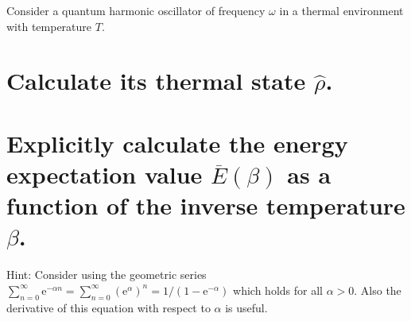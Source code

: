 \documentclass[boxes,pages]{homework}
\makeatletter
\newcommand{\e}{\mathrm{e}}
\numberwithin{@problem}{section}
\makeatother
\begin{document}
\begin{problem}
Consider a quantum harmonic oscillator of frequency $\omega$ in a thermal environment with temperature $T$.
\begin{parts}
	\part{Calculate its thermal state $\hat{\rho}$.}\label{part:3a}
	\part{Explicitly calculate the energy expectation value $\overline{E}(\beta)$ as a function of the inverse temperature $\beta$.}\label{part:3b}
\end{parts}
Hint: Consider using the geometric series $\sum_{n=0}^\infty\e^{-\alpha n} = \sum_{n=0}^\infty(\e^\alpha)^n = 1 / (1 - \e^{-\alpha})$ which holds for all $\alpha > 0$. Also the derivative of this equation with respect to $\alpha$ is useful.
\end{problem}
\end{document}
